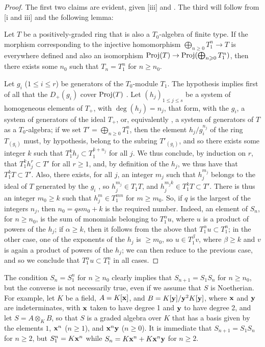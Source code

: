 \begin{proof}
\label{proof:2.8.2.14}
The first two claims are evident, given [iii] and .
The third will follow from [i and iii] and the following lemma:
\begin{lemma}[8.2.14.1]
\label{2.8.2.14.1}
Let $T$ be a positively-graded ring that is also a $T_0$-algebra of finite type.
If the morphism corresponding to the injective homomorphism $\bigoplus_{n\geq0}T_1^n\to T$ is everywhere defined and also an isomorphism $\Proj(T)\to\Proj(\bigoplus_{n\geq0}T_1^n)$, then there exists some $n_0$ such that $T_n=T_1^n$ for $n\geq n_0$.
\end{lemma}

Let $g_i$ ($1\leq i\leq r$) be generators of the $T_0$-module $T_1$.
The hypothesis implies first of all that the $D_+(g_i)$ cover $\operatorname{Proj}(T)$ .
Let $(h_j)_{1\leq j\leq s}$ be a system of homogeneous elements of $T_+$, with $\deg(h_j)=n_j$, that form, with the $g_i$, a system of generators of the ideal $T_+$, or, equivalently , a system of generators of $T$ as a $T_0$-algebra;
if we set $T'=\bigoplus_{n\geq0}T_1^n$, then the element $h_j/g_i^{n_j}$ of the ring $T_{(g_i)}$ must, by hypothesis, belong to the subring $T'_{(g_i)}$, and so there exists some integer $k$ such that $T_1^k h_j\subset T_1^{k+n_j}$ for all $j$.
We thus conclude, by induction on $r$, that $T_1^k h_j^r \subset T'$ for all $r\geq1$, and, by definition of the $h_j$, we thus have that $T_1^k T\subset T'$.
Also, there exists, for all $j$, an integer $m_j$ such that $h_j^{m_j}$ belongs to the ideal of $T$ generated by the $g_i$ , so $h_j^{m_j}\in T_1 T$, and
$h_j^{m_j k}\in T_1^k T\subset T'$.
There is thus an integer $m_0\geq k$ such that $h_j^m\in T_1^{mn}$ for $m\geq m_0$.
So, if $q$ is the largest of the integers $n_j$, then $n_0=qsm_0+k$ is the required number.
Indeed, an element of $S_n$, for $n\geq n_0$, is the sum of monomials belonging to $T_1^\alpha u$, where $u$ is a product of powers of the $h_j$;
if $\alpha\geq k$, then it follows from the above that $T_1^\alpha u\subset T_1^n$;
in the other case, one of the exponents of the $h_j$ is $\geq m_0$, so $u\in T_1^\beta v$, where $\beta\geq k$ and $v$ is again a product of powers of the $h_j$;
we can then reduce to the previous case, and so we conclude that $T_1^\alpha u\subset T_1^n$ in all cases.
\end{proof}

\begin{remark}[8.2.15]
\label{2.8.2.15}
The condition $S_n=S_1^n$ for $n\geq n_0$ clearly implies that $S_{n+1}=S_1S_n$ for $n\geq n_0$, but the converse is not necessarily true, even if we assume that $S$ is Noetherian.
For example, let $K$ be a field, $A=K[\mathbf{x}]$, and $B=K[\mathbf{y}]/\mathbf{y}^2K[\mathbf{y}]$, where $\mathbf{x}$ and $\mathbf{y}$ are indeterminates, with $\mathbf{x}$ taken to have degree 1 and $\mathbf{y}$ to have degree 2, and let $S=A\otimes_K B$, so that $S$ is a graded algebra over $K$ that has a basis given by the elements $1$, $\mathbf{x}^n$ ($n\geq1$), and $\mathbf{x}^n\mathbf{y}$ ($n\geq0$).
It is immediate that $S_{n+1}=S_1S_n$ for $n\geq2$, but $S_1^n=K\mathbf{x}^n$ while $S_n=K\mathbf{x}^n+K\mathbf{x}^n\mathbf{y}$ for $n\geq2$.
\end{remark}


